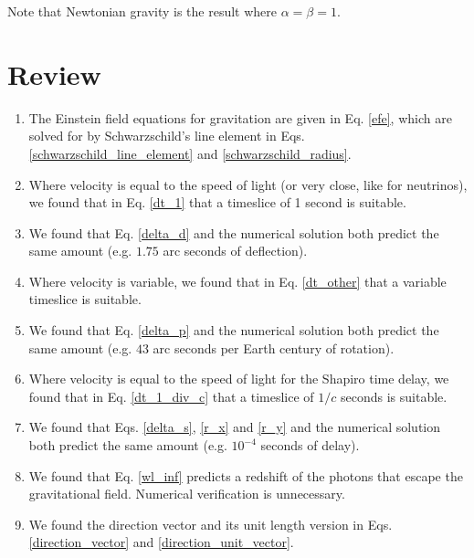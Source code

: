 \documentclass[12pt]{article}
\begin{document}
Note that Newtonian gravity is the result where $\alpha = \beta = 1$.





\section {Review}

\begin{enumerate}

\item
The Einstein field equations for gravitation are given in Eq. \ref{efe}, which are solved for by Schwarzschild's line element in Eqs. \ref{schwarzschild_line_element} and \ref{schwarzschild_radius}.

\item
Where velocity is equal to the speed of light (or very close, like for neutrinos), we found that in Eq. \ref{dt_1} that a timeslice of 1 second is suitable.

\item
We found that Eq. \ref{delta_d} and the numerical solution both predict the same amount (e.g. $1.75$ arc seconds of deflection).

\item
Where velocity is variable, we found that in Eq. \ref{dt_other} that a variable timeslice is suitable.

\item
We found that Eq. \ref{delta_p} and the numerical solution both predict the same amount (e.g. $43$ arc seconds per Earth century of rotation).

\item
Where velocity is equal to the speed of light for the Shapiro time delay, we found that in Eq. \ref{dt_1_div_c} that a timeslice of $1/c$ seconds is suitable.

\item 
We found that Eqs. \ref{delta_s}, \ref{r_x} and \ref{r_y} and the numerical solution both predict the same amount (e.g. $10^{-4}$ seconds of delay).

\item
We found that Eq. \ref{wl_inf} predicts a redshift of the photons that escape the gravitational field.
Numerical verification is unnecessary.

\item
We found the direction vector and its unit length version in Eqs. \ref{direction_vector} and \ref{direction_unit_vector}.


\end{enumerate}
\end{document}
